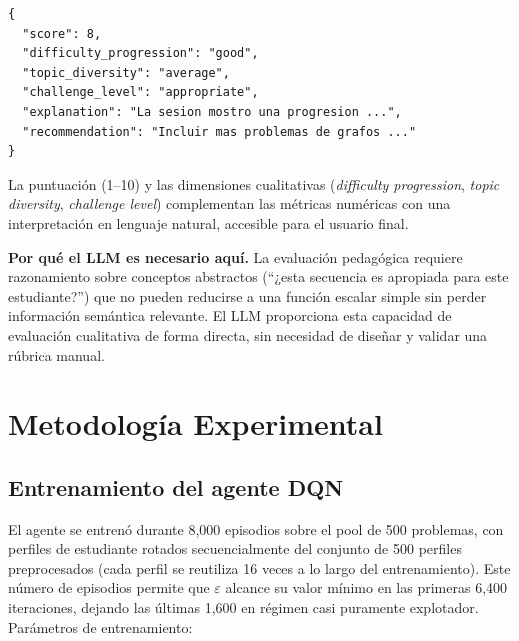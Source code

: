 \documentclass[12pt, a4paper]{article}
\begin{document}
\begin{lstlisting}[caption=Estructura de la evaluación pedagógica del LLM]
{
  "score": 8,
  "difficulty_progression": "good",
  "topic_diversity": "average",
  "challenge_level": "appropriate",
  "explanation": "La sesion mostro una progresion ...",
  "recommendation": "Incluir mas problemas de grafos ..."
}
\end{lstlisting}

La puntuación (1--10) y las dimensiones cualitativas (\textit{difficulty
progression}, \textit{topic diversity}, \textit{challenge level}) complementan
las métricas numéricas con una interpretación en lenguaje natural, accesible
para el usuario final.

\textbf{Por qué el LLM es necesario aquí.}
La evaluación pedagógica requiere razonamiento sobre conceptos abstractos
(``¿esta secuencia es apropiada para este estudiante?'') que no pueden
reducirse a una función escalar simple sin perder información semántica
relevante. El LLM proporciona esta capacidad de evaluación cualitativa de
forma directa, sin necesidad de diseñar y validar una rúbrica manual.

\section{Metodología Experimental}

\subsection{Entrenamiento del agente DQN}

El agente se entrenó durante 8{,}000 episodios sobre el pool de 500 problemas,
con perfiles de estudiante rotados secuencialmente del conjunto de 500
perfiles preprocesados (cada perfil se reutiliza 16 veces a lo largo del
entrenamiento). Este número de episodios permite que $\varepsilon$ alcance
su valor mínimo en las primeras 6{,}400 iteraciones, dejando las últimas
1{,}600 en régimen casi puramente explotador. Parámetros de entrenamiento:
\end{document}
